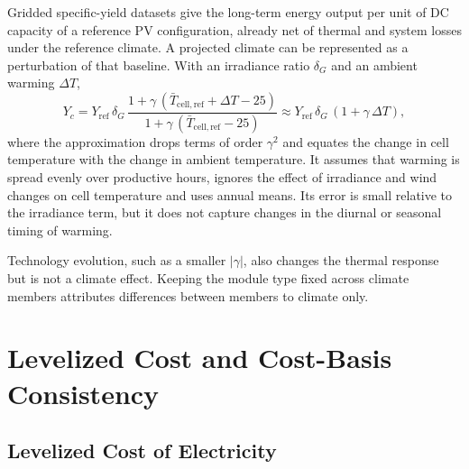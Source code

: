 Gridded specific-yield datasets give the long-term energy output per
unit of DC capacity of a reference PV configuration, already net of
thermal and system losses under the reference climate. A projected
climate can be represented as a perturbation of that baseline. With an
irradiance ratio $\delta_G$ and an ambient warming $\Delta T$,
\begin{equation}
    Y_c = Y_{\mathrm{ref}}\,\delta_G\,
      \frac{1+\gamma\,(\bar{T}_{\mathrm{cell,ref}}+\Delta T-25)}
           {1+\gamma\,(\bar{T}_{\mathrm{cell,ref}}-25)}
    \approx Y_{\mathrm{ref}}\,\delta_G\,(1+\gamma\,\Delta T),
    \label{eq:pv_perturbation}
\end{equation}
where the approximation drops terms of order $\gamma^2$ and equates the
change in cell temperature with the change in ambient temperature. It
assumes that warming is spread evenly over productive hours, ignores the
effect of irradiance and wind changes on cell temperature and uses annual
means. Its error is small relative to the irradiance term, but it does
not capture changes in the diurnal or seasonal timing of warming.

Technology evolution, such as a smaller $|\gamma|$, also changes the
thermal response but is not a climate effect. Keeping the module type
fixed across climate members attributes differences between members to
climate only.

\section{Levelized Cost and Cost-Basis Consistency}
\label{sec:lcoe_theory}

\subsection{Levelized Cost of Electricity}
\label{subsec:lcoe_definition}

